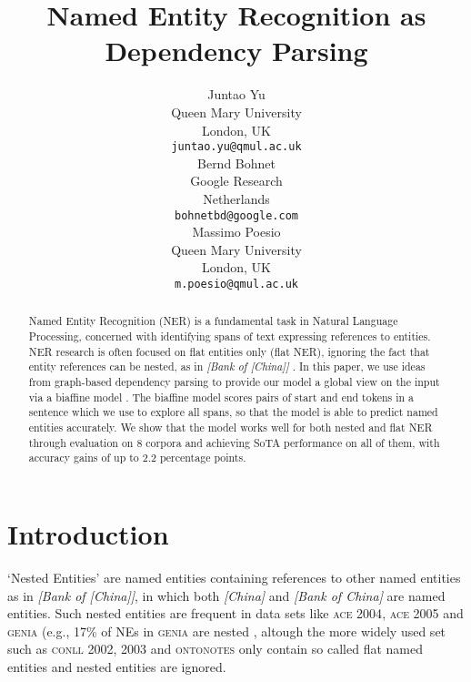 \documentclass[11pt,a4paper]{article}
\title{Named Entity Recognition as Dependency Parsing}
\author{Juntao Yu \\
  Queen Mary University \\
  London, UK \\
  \texttt{juntao.yu@qmul.ac.uk} \\\And
  Bernd Bohnet \\
  Google Research \\
  Netherlands \\
  \texttt{bohnetbd@google.com} \\\And
  Massimo Poesio\\
  Queen Mary University \\
  London, UK \\
  \texttt{m.poesio@qmul.ac.uk} \\}
\date{}
\newcommand{\ACRO}[1]{\textsc{#1}}
\newcommand{\GENIA}{\ACRO{genia}}
\newcommand{\ACEFOUR}{\ACRO{ace 2004}}
\newcommand{\ACEFIVE}{\ACRO{ace 2005}}
\newcommand{\CONLLTWO}{\ACRO{conll 2002}}
\newcommand{\ONTONOTES}{\ACRO{ontonotes}}
\begin{document}
\maketitle
\begin{abstract}

Named Entity Recognition (NER) is a fundamental task in Natural Language Processing, concerned with identifying spans of text expressing references to entities. NER research  is often focused on  flat entities only (flat NER), ignoring the fact that entity references can be nested, as in \textit{[Bank of [China]]} \cite{finkel-manning-2009-nested}. 
In this paper, we use ideas from graph-based dependency parsing to provide our model a global view on the input via a biaffine model \cite{dozat-and-manning2017-parser}. 
The biaffine model scores pairs of start and end tokens in a sentence which we use to explore all spans, so that the model is able to predict named entities accurately. 
We show that the model works well for both nested and flat NER 
through evaluation 
on 8 corpora and achieving SoTA performance on all of them, with accuracy gains of up to 2.2 percentage points. 


\end{abstract}

\section{Introduction}

`Nested Entities' are named entities containing references to other named entities as in 
\textit{[Bank of [China]]}, in which both \textit{[China]} and \textit{[Bank of China]} are named entities.
Such nested entities are frequent in data sets like {\ACEFOUR}, {\ACEFIVE} and {\GENIA} (e.g., 17\% of NEs in {\GENIA} are nested \cite{finkel-manning-2009-nested}, 
altough  the more widely used set such as {\CONLLTWO}, 2003 and {\ONTONOTES} only contain  so called flat named entities and nested entities are ignored. 
\end{document}
